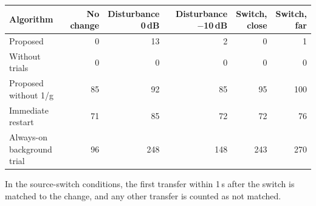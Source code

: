 \begin{table}[tbp]
\begin{tabular}{lrrrrr}
\toprule
Algorithm & \makecell{No\\change} & \makecell{Disturbance\\0\,dB} & \makecell{Disturbance\\$-$10\,dB} & \makecell{Switch,\\close} & \makecell{Switch,\\far} \\
\midrule
Proposed & 0 & 13 & 2 & 0 & 1 \\
Without trials & 0 & 0 & 0 & 0 & 0 \\
Proposed without 1/g & 85 & 92 & 85 & 95 & 100 \\
Immediate restart & 71 & 85 & 72 & 72 & 76 \\
\makecell[l]{Always-on\\background trial} & 96 & 248 & 148 & 243 & 270 \\
\bottomrule
\end{tabular}
\par\medskip
\begin{minipage}{0.98\textwidth}
\scriptsize
In the source-switch conditions, the first transfer within 1\,s after the switch is matched to the change, and any other transfer is counted as not matched.\par
\end{minipage}
\par{}
\end{table}
